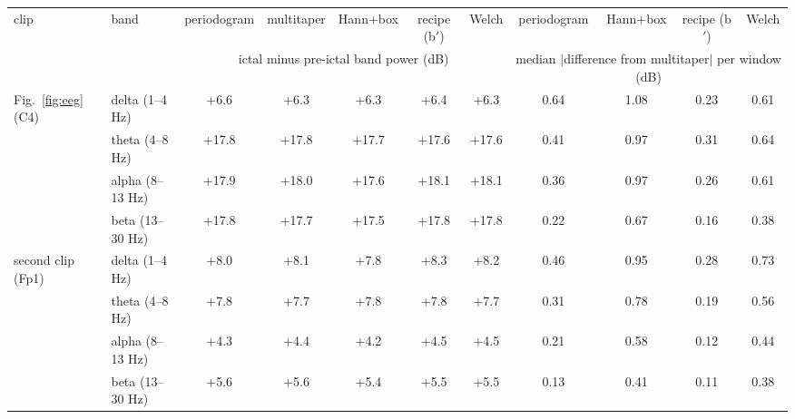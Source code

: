 \begin{tabular}{llccccc|cccc}
\toprule
clip & band & periodogram & multitaper & Hann+box & recipe (b$'$) & Welch & periodogram & Hann+box & recipe (b$'$) & Welch\\
 & & \multicolumn{5}{c|}{ictal minus pre-ictal band power (dB)} & \multicolumn{4}{c}{median $|$difference from multitaper$|$ per window (dB)}\\
\midrule
Fig.~\ref{fig:eeg} (C4) & delta (1--4 Hz) & +6.6 & +6.3 & +6.3 & +6.4 & +6.3 & 0.64 & 1.08 & 0.23 & 0.61\\
 & theta (4--8 Hz) & +17.8 & +17.8 & +17.7 & +17.6 & +17.6 & 0.41 & 0.97 & 0.31 & 0.64\\
 & alpha (8--13 Hz) & +17.9 & +18.0 & +17.6 & +18.1 & +18.1 & 0.36 & 0.97 & 0.26 & 0.61\\
 & beta (13--30 Hz) & +17.8 & +17.7 & +17.5 & +17.8 & +17.8 & 0.22 & 0.67 & 0.16 & 0.38\\
\midrule
second clip (Fp1) & delta (1--4 Hz) & +8.0 & +8.1 & +7.8 & +8.3 & +8.2 & 0.46 & 0.95 & 0.28 & 0.73\\
 & theta (4--8 Hz) & +7.8 & +7.7 & +7.8 & +7.8 & +7.7 & 0.31 & 0.78 & 0.19 & 0.56\\
 & alpha (8--13 Hz) & +4.3 & +4.4 & +4.2 & +4.5 & +4.5 & 0.21 & 0.58 & 0.12 & 0.44\\
 & beta (13--30 Hz) & +5.6 & +5.6 & +5.4 & +5.5 & +5.5 & 0.13 & 0.41 & 0.11 & 0.38\\
\bottomrule
\end{tabular}
